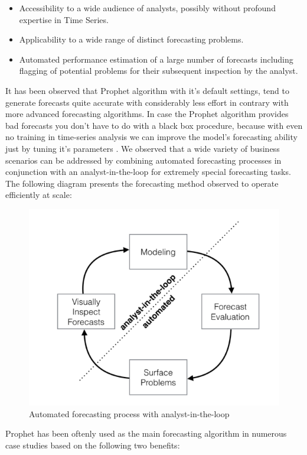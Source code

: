 \begin{itemize}
    \item Accessibility to a wide audience of analysts, possibly without profound expertise in Time Series.
    \item Applicability to a wide range of distinct forecasting problems.
    \item Automated performance estimation of a large number of forecasts including flagging of potential problems for their subsequent inspection by the analyst.
\end{itemize}
\par It has been observed that Prophet algorithm with it's default settings, tend to generate forecasts quite accurate with considerably less effort in contrary with more advanced forecasting algorithms. In case the Prophet algorithm provides bad forecasts you don't have to do with a black box procedure, because with even no training in time-series analysis we can improve the model's forecasting ability just by tuning it's parameters \cite{park2019144}. We observed that a wide variety of business scenarios can be addressed by combining automated forecasting processes in conjunction with an analyst-in-the-loop for extremely special forecasting tasks. The following diagram \cite{taylor2018forecasting} presents the forecasting method observed to operate efficiently at scale:
\begin{figure}[htbp]
\centering
\includegraphics[width=0.8\linewidth]{project/prophet.PNG}

\caption{Automated forecasting process with analyst-in-the-loop}
\end{figure}
Prophet has been oftenly used as the main forecasting algorithm in numerous case studies based on the following two benefits:
